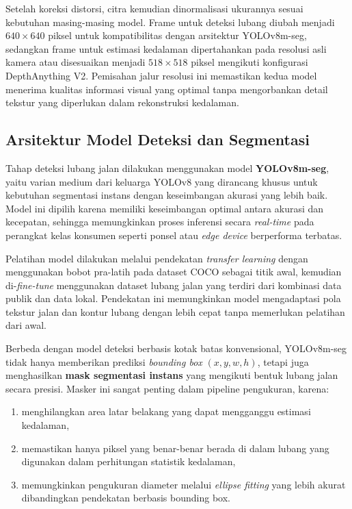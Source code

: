 \documentclass{iopjournal}
\begin{document}
Setelah koreksi distorsi, citra kemudian dinormalisasi ukurannya sesuai kebutuhan masing-masing model. Frame untuk deteksi lubang diubah menjadi $640 \times 640$ piksel untuk kompatibilitas dengan arsitektur YOLOv8m-seg, sedangkan frame untuk estimasi kedalaman dipertahankan pada resolusi asli kamera atau disesuaikan menjadi $518 \times 518$ piksel mengikuti konfigurasi DepthAnything V2. Pemisahan jalur resolusi ini memastikan kedua model menerima kualitas informasi visual yang optimal tanpa mengorbankan detail tekstur yang diperlukan dalam rekonstruksi kedalaman.

\subsection{Arsitektur Model Deteksi dan Segmentasi}
Tahap deteksi lubang jalan dilakukan menggunakan model \textbf{YOLOv8m-seg}, yaitu varian medium dari keluarga YOLOv8 yang dirancang khusus untuk kebutuhan segmentasi instans dengan keseimbangan akurasi yang lebih baik. Model ini dipilih karena memiliki keseimbangan optimal antara akurasi dan kecepatan, sehingga memungkinkan proses inferensi secara \textit{real-time} pada perangkat kelas konsumen seperti ponsel atau \textit{edge device} berperforma terbatas.

Pelatihan model dilakukan melalui pendekatan \textit{transfer learning} dengan menggunakan bobot pra-latih pada dataset COCO sebagai titik awal, kemudian di-\textit{fine-tune} menggunakan dataset lubang jalan yang terdiri dari kombinasi data publik dan data lokal. Pendekatan ini memungkinkan model mengadaptasi pola tekstur jalan dan kontur lubang dengan lebih cepat tanpa memerlukan pelatihan dari awal.

Berbeda dengan model deteksi berbasis kotak batas konvensional, YOLOv8m-seg tidak hanya memberikan prediksi \textit{bounding box} $(x, y, w, h)$, tetapi juga menghasilkan \textbf{mask segmentasi instans} yang mengikuti bentuk lubang jalan secara presisi. Masker ini sangat penting dalam pipeline pengukuran, karena:

\begin{enumerate}
    \item menghilangkan area latar belakang yang dapat mengganggu estimasi kedalaman,
    \item memastikan hanya piksel yang benar-benar berada di dalam lubang yang digunakan dalam perhitungan statistik kedalaman,
    \item memungkinkan pengukuran diameter melalui \textit{ellipse fitting} yang lebih akurat dibandingkan pendekatan berbasis bounding box.
\end{enumerate}
\end{document}
